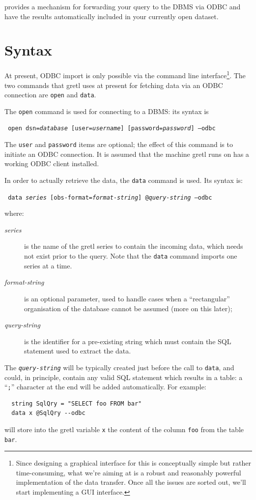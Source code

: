  provides a mechanism for forwarding your query to the DBMS
via ODBC and have the results automatically included in your currently
open dataset.

\section{Syntax}
\label{sec:odbc-syntax}

At present, ODBC import is only possible via the command line
interface\footnote{Since designing a graphical interface for this is
  conceptually simple but rather time-consuming, what we're aiming at
  is a robust and reasonably powerful implementation of the data
  transfer. Once all the issues are sorted out, we'll start
  implementing a GUI interface.}. The two commands that gretl uses at
present for fetching data via an ODBC connection are \texttt{open} and
\texttt{data}.

The \texttt{open} command is used for connecting to a DBMS: its syntax
is
\begin{flushleft}
\texttt{%
  open dsn=\emph{database} [user=\emph{username}]
  [password=\emph{password}] --odbc
}
\end{flushleft}
The \texttt{user} and \texttt{password} items are optional; the effect
of this command is to initiate an ODBC connection. It is assumed that
the machine gretl runs on has a working ODBC client installed.

In order to actually retrieve the data, the \texttt{data} command is
used. Its syntax is:
\begin{flushleft}
\texttt{%
  data \emph{series} [obs-format=\emph{format-string}] @\emph{query-string} --odbc
}
\end{flushleft}
where:
\begin{description}
\item[\emph{series}] is the name of the gretl series to contain the
  incoming data, which needs not exist prior to the query. Note that
  the \texttt{data} command imports one series at a time.
\item[\emph{format-string}] is an optional parameter, used to handle
  cases when a ``rectangular'' organisation of the database cannot be
  assumed (more on this later);
\item[\emph{query-string}] is the identifier for a pre-existing string
  which must contain the SQL statement used to extract the data.
\end{description}

The \texttt{\emph{query-string}} will be typically created just before
the call to \texttt{data}, and could, in principle, contain any
valid SQL statement which results in a table: a ``\texttt{;}''
character at the end will be added automatically. For example:
\begin{verbatim}
  string SqlQry = "SELECT foo FROM bar"
  data x @SqlQry --odbc
\end{verbatim}
will store into the gretl variable \texttt{x} the content of the
column \texttt{foo} from the table \texttt{bar}.

